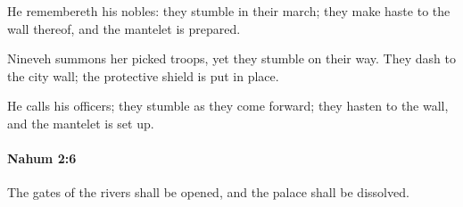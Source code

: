 			\begin{versebox}
					\item[BHS] 
					\item[LXX] 
					\item[ASV] He remembereth his nobles: they stumble in their march; they make haste to the wall thereof, and the mantelet is prepared.
					\item[NIV] Nineveh summons her picked troops, yet they stumble on their way. They dash to the city wall; the protective shield is put in place.
					\item[NRSV] He calls his officers; they stumble as they come forward; they hasten to the wall, and the mantelet is set up.
			\end{versebox}

		\paragraph{Nahum 2:6} %
			\label{NAHUM-2-6}

			The gates of the rivers shall be opened, and the palace shall be dissolved.

